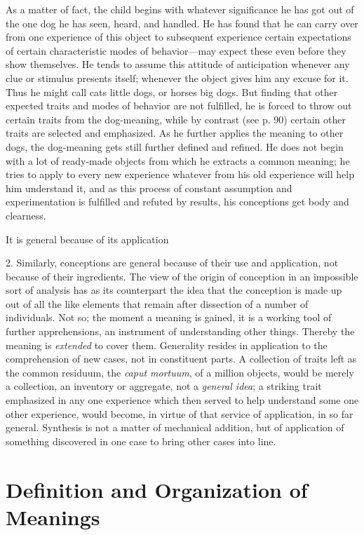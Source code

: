 \documentclass[letterpaper]{book}
\begin{document}
As a matter of fact, the child begins with whatever significance he has
got out of the one dog he has seen, heard, and handled. He has found
that he can carry over from one experience of this object to subsequent
experience certain expectations of certain characteristic modes of
behavior---may expect these even before they show themselves. He tends
to assume this attitude of anticipation whenever any clue or stimulus
presents itself; whenever the object gives him any excuse for it. Thus
he might call cats little dogs, or horses big dogs. But finding that
other expected traits and modes of behavior are not fulfilled, he is
forced to throw out certain traits from the dog-meaning, while by
contrast (see p. 90) certain other traits are selected and emphasized.
As he further applies the meaning to other dogs, the dog-meaning gets
still further defined and refined. He does not begin with a lot of
ready-made objects from which he extracts a common meaning; he tries to
apply to every new experience whatever from his old experience will help
him understand
it,
and as this process of constant assumption and experimentation is
fulfilled and refuted by results, his conceptions get body and
clearness.

It is general because of its application

2. Similarly, conceptions are general because of their use and
application, not because of their ingredients. The view of the origin of
conception in an impossible sort of analysis has as its counterpart the
idea that the conception is made up out of all the like elements that
remain after dissection of a number of individuals. Not so; the moment a
meaning is gained, it is a working tool of further apprehensions, an
instrument of understanding other things. Thereby the meaning is
\emph{extended} to cover them. Generality resides in application to the
comprehension of new cases, not in constituent parts. A collection of
traits left as the common residuum, the \emph{caput mortuum}, of a
million objects, would be merely a collection, an inventory or
aggregate, not a \emph{general idea}; a striking trait emphasized in any
one experience which then served to help understand some one other
experience, would become, in virtue of that service of application, in
so far general. Synthesis is not a matter of mechanical addition, but of
application of something discovered in one case to bring other cases
into line.

\section{Definition and Organization of Meanings}
\end{document}
